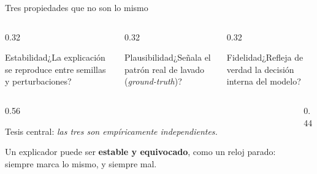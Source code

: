\documentclass[aspectratio=169,11pt]{beamer}
\begin{document}
\begin{frame}{Tres propiedades que no son lo mismo}
\begin{columns}[T]
\begin{column}{0.32\textwidth}
\begin{block}{Estabilidad}\small ¿La explicación se reproduce entre semillas y perturbaciones?\end{block}
\end{column}
\begin{column}{0.32\textwidth}
\begin{block}{Plausibilidad}\small ¿Señala el patrón real de lavado (\emph{ground-truth})?\end{block}
\end{column}
\begin{column}{0.32\textwidth}
\begin{block}{Fidelidad}\small ¿Refleja de verdad la decisión interna del modelo?\end{block}
\end{column}
\end{columns}
\vspace{0.5em}
\begin{columns}[c]
\begin{column}{0.56\textwidth}
\begin{center}
\alert{Tesis central:} \emph{las tres son empíricamente independientes.}
\end{center}
\vspace{0.2em}
{\footnotesize\color{muted} Un explicador puede ser \textbf{estable y equivocado}, como un reloj parado: siempre marca lo mismo, y siempre mal.}
\end{column}
\begin{column}{0.44\textwidth}\centering
{}
\end{column}
\end{columns}
\end{frame}
\end{document}
